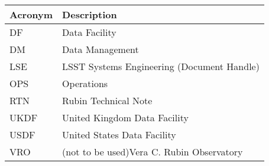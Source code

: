 \addtocounter{table}{-1}
\begin{longtable}{p{}p{}}\hline
\textbf{Acronym} & \textbf{Description}  \\\hline

DF & Data Facility \\\hline
DM & Data Management \\\hline
LSE & LSST Systems Engineering (Document Handle) \\\hline
OPS & Operations \\\hline
RTN & Rubin Technical Note \\\hline
UKDF & United Kingdom Data Facility \\\hline
USDF & United States Data Facility \\\hline
VRO & (not to be used)Vera C. Rubin Observatory \\\hline
\end{longtable}
